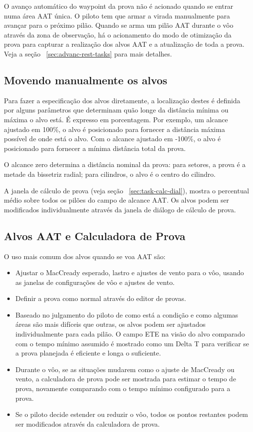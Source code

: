 O avanço automático do waypoint da prova não é acionado quando se entrar numa área AAT única.  O piloto tem que armar a virada manualmente para avançar para o próximo pilão.  Quando se arma um pilão AAT durante o vôo através da zona de observação, há o acionamento do modo de otimização da prova para capturar a realização dos alvos AAT e a atualização de toda a prova.   Veja a seção ~\ref{sec:advanc-rest-tasks} 
para mais detalhes.

\subsection*{Movendo manualmente os alvos}

Para fazer a especificação dos alvos diretamente, a localização destes é definida por alguns parâmetros que determinam quão longe da distância mínima ou máxima o alvo está. É expresso em porcentagem.  Por exemplo, um alcance ajustado em 100\%, o alvo é posicionado para fornecer a distância máxima possível de onde está o alvo.  Com o alcance ajustado em -100\%, o alvo é posicionado para fornecer a mínima distância total da prova.

O alcance zero determina a distância nominal da prova:  para setores, a prova é a metade da bissetriz radial; para cilindros, o alvo é o centro do cilindro.

A janela de cálculo de prova (veja seção ~\ref{sec:task-calc-dial}), mostra o percentual médio sobre todos os pilões do campo de alcance AAT.  Os alvos podem ser modificados individualmente através da janela de diálogo de cálculo de prova.


\subsection*{Alvos AAT e Calculadora de Prova}

O uso mais comum dos alvos quando se voa AAT são:
\begin{itemize}
\item Ajustar o MacCready esperado, lastro e ajustes de vento para o vôo, usando as janelas de configurações de vôo e ajustes de vento.
\item Definir a prova como normal através do editor de provas.
\item Baseado no julgamento do piloto de como está a condição e como algumas áreas são mais difíceis que outras, os alvos podem ser ajustados individualmente para cada pilão.  O campo ETE na visão do alvo comparado com o tempo mínimo assumido é mostrado como um Delta T para verificar se a prova planejada é eficiente e longa o suficiente.
\item Durante o vôo, se as situações mudarem como o ajuste de MacCready ou vento, a calculadora de prova pode ser mostrada para estimar o tempo de prova, novamente comparando com o tempo mínimo configurado para a prova.
\item Se o piloto decide estender ou reduzir o vôo, todos os pontos restantes podem ser modificados através da calculadora de prova.
\end{itemize}

